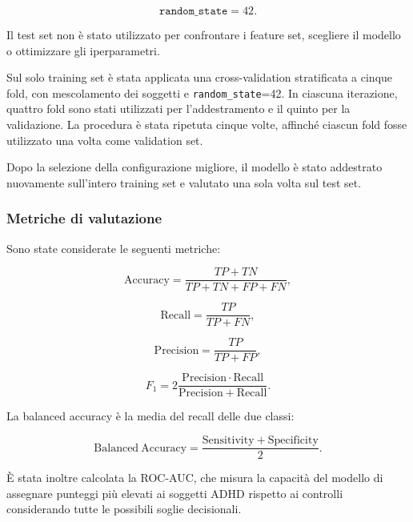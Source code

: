 \begin{equation}
	\texttt{random\_state}=42.
\end{equation}

Il test set non è stato utilizzato per confrontare i feature set,
scegliere il modello o ottimizzare gli iperparametri.

Sul solo training set è stata applicata una cross-validation
stratificata a cinque fold, con mescolamento dei soggetti e
\texttt{random\_state}=42. In ciascuna iterazione, quattro fold sono
stati utilizzati per l'addestramento e il quinto per la validazione.
La procedura è stata ripetuta cinque volte, affinché ciascun fold
fosse utilizzato una volta come validation set.

Dopo la selezione della configurazione migliore, il modello è stato
addestrato nuovamente sull'intero training set e valutato una sola
volta sul test set.


\subsubsection{Metriche di valutazione}

Sono state considerate le seguenti metriche:

\begin{equation}
	\mathrm{Accuracy}
	=
	\frac{TP+TN}{TP+TN+FP+FN},
\end{equation}

\begin{equation}
	\mathrm{Recall}
	=
	\frac{TP}{TP+FN},
\end{equation}

\begin{equation}
	\mathrm{Precision}
	=
	\frac{TP}{TP+FP},
\end{equation}

\begin{equation}
	F_1
	=
	2
	\frac{
		\mathrm{Precision}\cdot\mathrm{Recall}
	}{
		\mathrm{Precision}+\mathrm{Recall}
	}.
\end{equation}

La balanced accuracy è la media del recall delle due classi:

\begin{equation}
	\mathrm{Balanced\ Accuracy}
	=
	\frac{
		\mathrm{Sensitivity}
		+
		\mathrm{Specificity}
	}{2}.
\end{equation}

È stata inoltre calcolata la ROC-AUC, che misura la capacità del
modello di assegnare punteggi più elevati ai soggetti ADHD rispetto
ai controlli considerando tutte le possibili soglie decisionali.


